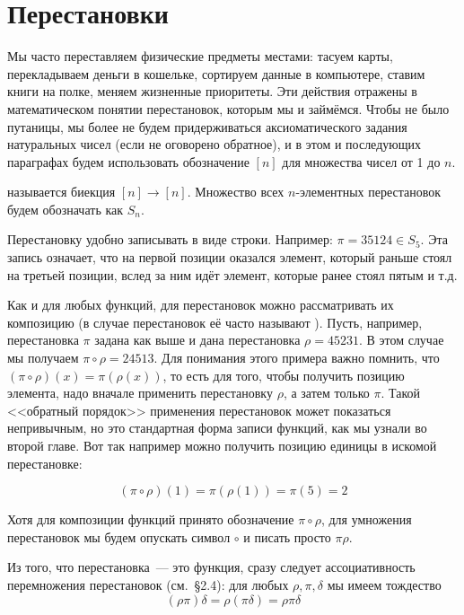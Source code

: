 \section{Перестановки}

Мы часто переставляем физические предметы местами: тасуем карты, перекладываем деньги в кошельке, сортируем данные в компьютере, ставим книги на полке, меняем жизненные приоритеты. Эти действия отражены в математическом понятии перестановок, которым мы и займёмся. Чтобы не было путаницы, мы более не будем придерживаться аксиоматического задания натуральных чисел (если не оговорено обратное), и в этом и последующих параграфах будем использовать обозначение $[n]$ для множества чисел от 1 до $n$.

\begin{definition}
 называется биекция $[n]\to[n]$. Множество всех $n$-элементных перестановок будем обозначать как $S_n$.
\end{definition}

Перестановку удобно записывать в виде строки. Например: $\pi = 35124 \in S_5$. Эта запись означает, что на первой позиции оказался элемент, который раньше стоял на третьей позиции, вслед за ним идёт элемент, которые ранее стоял пятым и т.д.

Как и для любых функций, для перестановок можно рассматривать их композицию (в случае перестановок её часто называют ). Пусть, например, перестановка $\pi$ задана как выше и дана перестановка $\rho = 45231$. В этом случае мы получаем $\pi \circ \rho = 24513$. Для понимания этого примера важно помнить, что $(\pi\circ\rho)(x) = \pi(\rho(x))$, то есть для того, чтобы получить позицию элемента, надо вначале применить перестановку $\rho$, а затем только $\pi$. Такой <<обратный порядок>> применения перестановок может показаться непривычным, но это стандартная форма записи функций, как мы узнали во второй главе. Вот так например можно получить позицию единицы в искомой перестановке:

$$(\pi\circ\rho) (1) = \pi(\rho(1)) = \pi(5) = 2$$

Хотя для композиции функций принято обозначение $\pi\circ\rho$, для умножения перестановок мы будем опускать символ $\circ$ и писать просто $\pi\rho$.

Из того, что перестановка~--- это функция, сразу следует ассоциативность перемножения перестановок (см.~\S2.4): для любых $\rho, \pi, \delta$ мы имеем тождество
$$(\rho\pi)\delta = \rho(\pi\delta) = \rho\pi\delta$$

